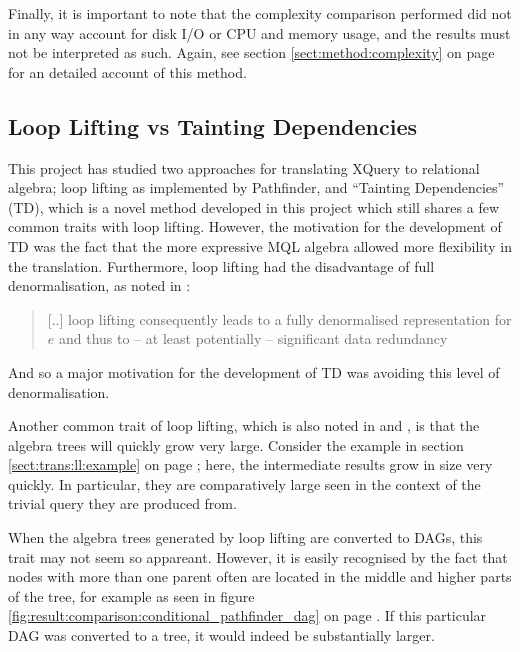 Finally, it is important to note that the complexity comparison performed did
not in any way account for disk I/O or CPU and memory usage, and the results
must not be interpreted as such. Again, see section \ref{sect:method:complexity} on
page \pageref{sect:method:complexity} for an detailed account of this method.

\subsection{Loop Lifting vs Tainting Dependencies}
\label{sect:disc:llvsTD}
This project has studied two approaches for translating XQuery to relational
algebra; loop lifting as implemented by Pathfinder, and ``Tainting
Dependencies'' (TD), which is a novel method developed in this project which
still shares a few common traits with loop lifting. However, the motivation for
the development of TD was the fact that the more expressive MQL algebra allowed
more flexibility in the translation. Furthermore, loop lifting had the
disadvantage of full denormalisation, as noted in
\cite{pathfinder_purelyRelational}: 

\begin{quote}
[..] loop lifting consequently leads to a fully denormalised representation for
$e$ and thus to -- at least potentially -- significant data redundancy
\end{quote}

And so a major motivation for the development of TD was avoiding this level of
denormalisation.

Another common trait of loop lifting, which is also noted in
\cite{pathfinder_mothertongue} and \cite{pathfinder_purelyRelational}, is that
the algebra trees will quickly grow very large. Consider the example in section 
\ref{sect:trans:ll:example} on page \pageref{sect:trans:ll:example}; here, the
intermediate results grow in size very quickly. In particular, they are
comparatively large seen in the context of the trivial query they are produced
from.

When the algebra trees generated by loop lifting are converted to DAGs, this
trait may not seem so appareant. However, it is easily recognised by the fact
that nodes with more than one parent often are located in the middle and higher
parts of the tree, for example as seen in figure
\ref{fig:result:comparison:conditional_pathfinder_dag} on page
\pageref{fig:result:comparison:conditional_pathfinder_dag}. If this particular
DAG was converted to a tree, it would indeed be substantially larger.

